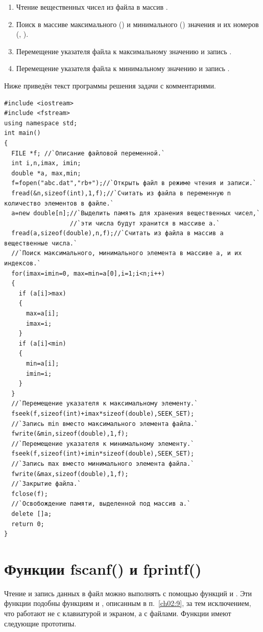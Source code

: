 \begin{enumerate}
\item Чтение вещественных чисел из файла в массив .
\item Поиск в массиве  максимального () и минимального
() значения и их номеров (, ).
\item Перемещение указателя файла к максимальному значению и запись .
\item Перемещение указателя файла к минимальному значению и запись .
\end{enumerate}
Ниже приведён текст программы решения задачи с комментариями.
\begin{lstlisting}
#include <iostream>
#include <fstream>
using namespace std;
int main()
{
  FILE *f; //`Описание файловой переменной.` 
  int i,n,imax, imin;
  double *a, max,min;
  f=fopen("abc.dat","rb+");//`Открыть файл в режиме чтения и записи.`
  fread(&n,sizeof(int),1,f);//`Считать из файла в переменную n количество элементов в файле.`
  a=new double[n];//`Выделить память для хранения вещественных чисел,`
                  //`эти числа будут хранится в массиве a.`
  fread(a,sizeof(double),n,f);//`Считать из файла в массив a вещественные числа.`
  //`Поиск максимального, минимального элемента в массиве a, и их индексов.`
  for(imax=imin=0, max=min=a[0],i=1;i<n;i++) 
  {
    if (a[i]>max) 
    {
      max=a[i];
      imax=i;
    }
    if (a[i]<min)
    {
      min=a[i];
      imin=i;
    }
  }
  //`Перемещение указателя к максимальному элементу.`
  fseek(f,sizeof(int)+imax*sizeof(double),SEEK_SET);
  //`Запись min вместо максимального элемента файла.`
  fwrite(&min,sizeof(double),1,f);
  //`Перемещение указателя к минимальному элементу.`
  fseek(f,sizeof(int)+imin*sizeof(double),SEEK_SET);
  //`Запись max вместо минимального элемента файла.`
  fwrite(&max,sizeof(double),1,f);
  //`Закрытие файла.`
  fclose(f);
  //`Освобождение памяти, выделенной под массив a.`
  delete []a;
  return 0;
}
\end{lstlisting}

\section[Функции fscanf() и fprintf()]{Функции fscanf() и fprintf()}
Чтение и запись данных в файл можно выполнять с помощью функций  и
. Эти функции подобны функциям  и
, описанным в п.~\ref{ch02:9}, за тем исключением, что работают не с клавиатурой и
экраном, а с файлами. Функции имеют следующие прототипы.


